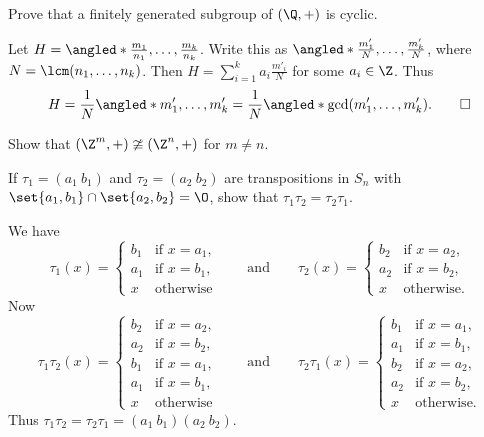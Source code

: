 \documentclass[12pt]{article}
\begin{document}
\begin{problem}
    Prove that a finitely generated subgroup of $(\Q, +)$ is cyclic.
\end{problem}
\begin{solution}
    Let $H = \angled*{\frac{m_1}{n_1}, \dots, \frac{m_k}{n_k}}$.
    Write this as $\angled*{\frac{m'_1}{N}, \dots, \frac{m'_k}{N}}$,
    where $N = \lcm(n_1, \dots, n_k)$.
    Then $H = \sum_{i=1}^k a_i \frac{m'_i}{N}$ for some $a_i \in \Z$.
    Thus \[
        H = \frac1N \angled*{m'_1, \dots, m'_k}
        = \frac1N \angled*{\gcd(m'_1, \dots, m'_k)}. \qedhere
    \]
\end{solution}

\begin{problem}
    Show that $(\Z^m, +) \ncong (\Z^n, +)$ for $m \ne n$.
\end{problem}

\begin{problem}
    If $\tau_1 = (a_1\ b_1)$ and $\tau_2 = (a_2\ b_2)$ are transpositions
    in $S_n$ with $\set{a_1, b_1} \cap \set{a_2, b_2} = \O$,
    show that $\tau_1 \tau_2 = \tau_2 \tau_1$.
\end{problem}
\begin{solution}
    We have \[
        \tau_1(x) = \begin{cases}
            b_1 & \text{if } x = a_1, \\
            a_1 & \text{if } x = b_1, \\
            x & \text{otherwise}
        \end{cases}
        \qquad \text{and} \qquad
        \tau_2(x) = \begin{cases}
            b_2 & \text{if } x = a_2, \\
            a_2 & \text{if } x = b_2, \\
            x & \text{otherwise.}
        \end{cases}
    \] Now \[
        \tau_1 \tau_2(x) = \begin{cases}
            b_2 & \text{if } x = a_2, \\
            a_2 & \text{if } x = b_2, \\
            b_1 & \text{if } x = a_1, \\
            a_1 & \text{if } x = b_1, \\
            x & \text{otherwise}
        \end{cases}
        \qquad \text{and} \qquad
        \tau_2 \tau_1(x) = \begin{cases}
            b_1 & \text{if } x = a_1, \\
            a_1 & \text{if } x = b_1, \\
            b_2 & \text{if } x = a_2, \\
            a_2 & \text{if } x = b_2, \\
            x & \text{otherwise.}
        \end{cases}
    \] Thus $\tau_1 \tau_2 = \tau_2 \tau_1 = (a_1\ b_1) (a_2\ b_2)$.
\end{solution}
\end{document}
